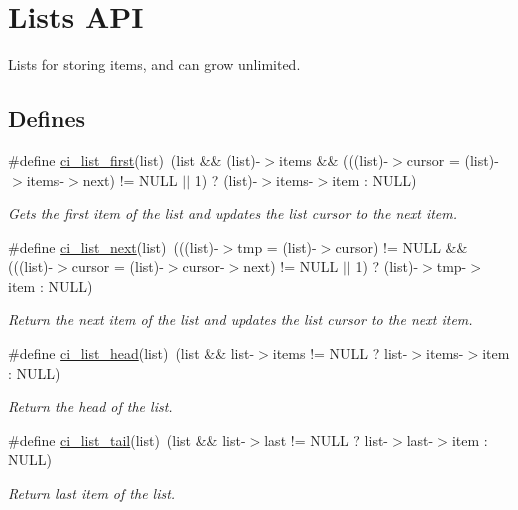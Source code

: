 \hypertarget{group__LISTS}{
\section{Lists API}
\label{group__LISTS}
}


Lists for storing items, and can grow unlimited.  
\subsection*{Defines}
\begin{DoxyCompactItemize}
\item 
\#define \hyperlink{group__LISTS_ga77f44d5b3bada068ec700d4b281c3a1f}{ci\_\-list\_\-first}(list)~(list \&\& (list)-\/$>$items \&\& (((list)-\/$>$cursor = (list)-\/$>$items-\/$>$next) != NULL $|$$|$ 1) ? (list)-\/$>$items-\/$>$item : NULL)
\begin{DoxyCompactList}\small\item\em Gets the first item of the list and updates the list cursor to the next item. \item\end{DoxyCompactList}\item 
\#define \hyperlink{group__LISTS_gaeb3e08e79c3a29024821a46bb76d9870}{ci\_\-list\_\-next}(list)~(((list)-\/$>$tmp = (list)-\/$>$cursor) != NULL \&\& (((list)-\/$>$cursor = (list)-\/$>$cursor-\/$>$next) != NULL $|$$|$ 1) ? (list)-\/$>$tmp-\/$>$item : NULL)
\begin{DoxyCompactList}\small\item\em Return the next item of the list and updates the list cursor to the next item. \item\end{DoxyCompactList}\item 
\hypertarget{group__LISTS_gaf391ee530c48d632527eefc229301101}{
\#define \hyperlink{group__LISTS_gaf391ee530c48d632527eefc229301101}{ci\_\-list\_\-head}(list)~(list \&\& list-\/$>$items != NULL ? list-\/$>$items-\/$>$item : NULL)}
\label{group__LISTS_gaf391ee530c48d632527eefc229301101}

\begin{DoxyCompactList}\small\item\em Return the head of the list. \item\end{DoxyCompactList}\item 
\hypertarget{group__LISTS_ga192e5880c2b4672ac2e4027ea1a8a9af}{
\#define \hyperlink{group__LISTS_ga192e5880c2b4672ac2e4027ea1a8a9af}{ci\_\-list\_\-tail}(list)~(list \&\& list-\/$>$last != NULL ? list-\/$>$last-\/$>$item : NULL)}
\label{group__LISTS_ga192e5880c2b4672ac2e4027ea1a8a9af}

\begin{DoxyCompactList}\small\item\em Return last item of the list. \item\end{DoxyCompactList}\end{DoxyCompactItemize}
